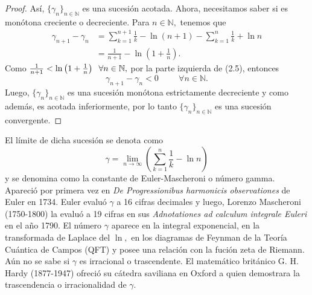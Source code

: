 \begin{proof}
	Así, $\{\gamma_n\}_{n \in \mathbb{N}}$ es una sucesión acotada. Ahora, necesitamos saber si es monótona creciente o decreciente. Para $n \in \mathbb{N},$ tenemos que
	\begin{align*}
	\gamma_{n+1}-\gamma_n &= \sum_{k = 1}^{n+1}\frac{1}{k}-\ln (n+1)-\sum_{k = 1}^{n}\frac{1}{k}+\ln n\\
	&= \frac{1}{n+1}-\ln \left(1+\frac{1}{n}\right).
	\end{align*}
	Como $\frac{1}{n+1} < \ln \left(1+\frac{1}{n}\right)\hspace{0.2cm}\forall n \in \mathbb{N},$ por la parte izquierda de (2.5), entonces $$\gamma_{n+1}-\gamma_n < 0\hspace{1cm}\forall n \in \mathbb{N}.$$
	Luego, $\{\gamma_n\}_{n \in \mathbb{N}}$ es una sucesión monótona estrictamente decreciente y como además, es acotada inferiormente, por lo tanto $\{\gamma_n\}_{n \in \mathbb{N}}$ es una sucesión convergente.
\end{proof}
El límite de dicha sucesión se denota como $$\gamma = \lim_{n \rightarrow \infty}\left(\sum_{k = 1}^{n}\frac{1}{k}-\ln n	\right)$$ y se denomina como la constante de Euler-Mascheroni o número gamma. Apareció por primera vez en \textit{De Progressionibus harmonicis observationes} de Euler en 1734. Euler evaluó $\gamma$ a 16 cifras decimales y luego, Lorenzo Mascheroni (1750-1800) la evaluó a 19 cifras en sus \textit{Adnotationes ad calculum integrale Euleri} en el año 1790. El número $\gamma$ aparece en la integral exponencial, en la transformada de Laplace del $\ln,$ en los diagramas de Feynman de la Teoría Cuántica de Campos (QFT) y posee una relación con la fución zeta de Riemann. Aún no se sabe si $\gamma$ es irracional o trascendente. El matemático británico G. H. Hardy (1877-1947) ofreció su cátedra saviliana en Oxford a quien demostrara la trascendencia o irracionalidad de $\gamma.$

